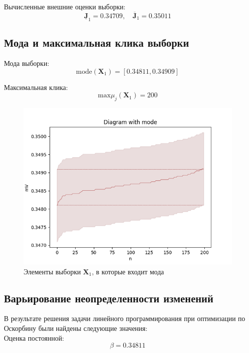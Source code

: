 Вычисленные внешние оценки выборки: 
\begin{equation*}
	\underline{\bm{J}}_1 = 0.34709 , \quad \overline{\bm{J}}_1 = 0.35011
\end{equation*}
\subsection{Мода и максимальная клика выборки} 

Мода выборки: 
\begin{equation*}
	\text{mode}(\bm{X}_1) = [0.34811, 0.34909]
\end{equation*}

Максимальная клика: 
\begin{equation*}
	\text{max} \mu_j (\bm{X}_1) = 200
\end{equation*}

\begin{figure}[H]
	\begin{center}
		\includegraphics[scale = 0.55]{resources/diagram_with_mode.png}
	\end{center} 
	\caption{Элементы выборки $\bm{X}_1$, в которые входит мода} \label{pic:mode}
\end{figure}

\subsection{Варьирование неопределенности изменений}

В результате решения задачи линейного программирования при оптимизации по Оскорбину были найдены следующие значения: \\
Оценка постоянной: 
\begin{equation*}
	\beta = 0.34811
\end{equation*}

